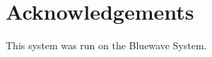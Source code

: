 \section{Acknowledgements}
\label{sec:acknowledgements}

This system was run on the Bluewave System.
